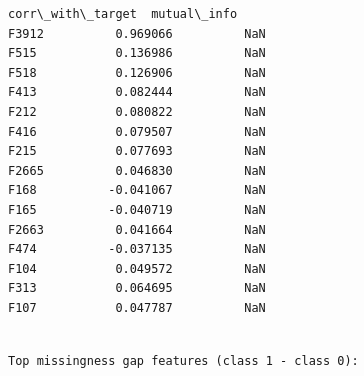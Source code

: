 \documentclass[11pt]{article}
\begin{document}
\begin{Verbatim}[commandchars=\\\{\}]
       corr\_with\_target  mutual\_info  
F3912          0.969066          NaN  
F515           0.136986          NaN  
F518           0.126906          NaN  
F413           0.082444          NaN  
F212           0.080822          NaN  
F416           0.079507          NaN  
F215           0.077693          NaN  
F2665          0.046830          NaN  
F168          -0.041067          NaN  
F165          -0.040719          NaN  
F2663          0.041664          NaN  
F474          -0.037135          NaN  
F104           0.049572          NaN  
F313           0.064695          NaN  
F107           0.047787          NaN  
    \end{Verbatim}

    
    \begin{Verbatim}[commandchars=\\\{\}]

Top missingness gap features (class 1 - class 0):
    \end{Verbatim}
\end{document}

